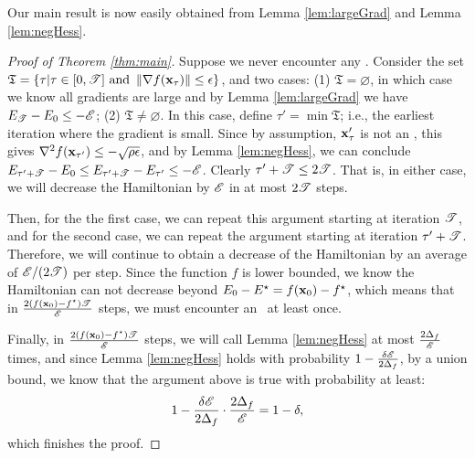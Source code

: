 Our main result is now easily obtained from Lemma \ref{lem:largeGrad} and Lemma \ref{lem:negHess}.

\begin{proof}[Proof of Theorem \ref{thm:main}]
Suppose we never encounter any \ESSP. Consider the set $\mathfrak{T} = \{\tau | \tau \in [0, \mathscr{T}] \text{~and~}
\left\|{\nabla f(\mathbf{x}_\tau)}\right\| \le \epsilon\}$, and two cases: (1) $\mathfrak{T} = \varnothing$, in which case we know all gradients are large and by Lemma \ref{lem:largeGrad} we have $E_{\mathscr{T}} - E_0 \le -\mathscr{E}$;
(2) $\mathfrak{T} \neq \varnothing$.  In this case, define $\tau' = \min \mathfrak{T}$; i.e., the earliest iteration where the gradient is small. Since by assumption, $\mathbf{x}_\tau'$ is not an \ESSP, this gives $\nabla^2 f(\mathbf{x}_{\tau'}) \le - \sqrt{\rho\epsilon}$, and by Lemma \ref{lem:negHess}, we can conclude $E_{\tau'+\mathscr{T}} - E_0 \le
E_{\tau'+\mathscr{T}} - E_{\tau'} \le -\mathscr{E}$. Clearly $\tau'+\mathscr{T} \le 2\mathscr{T}$. That is, in either case, we will decrease the Hamiltonian by $\mathscr{E}$ in at most $2\mathscr{T}$ steps.

Then, for the the first case, we can repeat this argument starting at iteration $\mathscr{T}$, and for the second case, we can repeat the argument starting at iteration $\tau'+\mathscr{T}$. Therefore, we will continue to obtain a decrease of the Hamiltonian by an average of $\mathscr{E}/(2\mathscr{T})$ per step. Since the function $f$ is lower bounded, we know the Hamiltonian can not decrease beyond $E_0 - E^\star = f(\mathbf{x}_0) - f^\star$, which means that in $\frac{2(f(\mathbf{x}_0) - f^\star)\mathscr{T}}{\mathscr{E}}$ steps, we must encounter an \ESSP~at least once.

Finally, in $\frac{2(f(\mathbf{x}_0) - f^\star)\mathscr{T}}{\mathscr{E}}$ steps, we will call Lemma \ref{lem:negHess} at most $\frac{2\Delta_f}{\mathscr{E}}$ times, and since Lemma \ref{lem:negHess} holds with probability $1-\frac{\delta \mathscr{E}}{2\Delta_f}$, by a union bound, we know that the argument above is true with probability at least:
$$1-\frac{\delta \mathscr{E}}{2\Delta_f}\cdot \frac{2\Delta_f}{\mathscr{E}} = 1-\delta,$$
which finishes the proof.
\end{proof}

